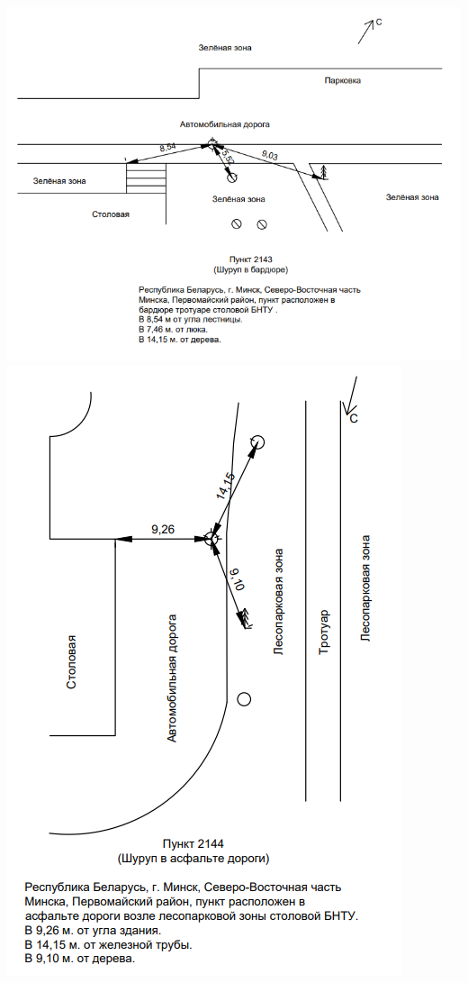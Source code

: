 \documentclass[a4paper]{article}
\begin{document}
\begin{newpage}
\begin{center}
            \includegraphics[scale=1.2]{abrisy/Абрис 2143.png}
            \includegraphics[scale=1.2]{abrisy/Абрис 2144.png}

\end{center}
\end{newpage}
\end{document}
